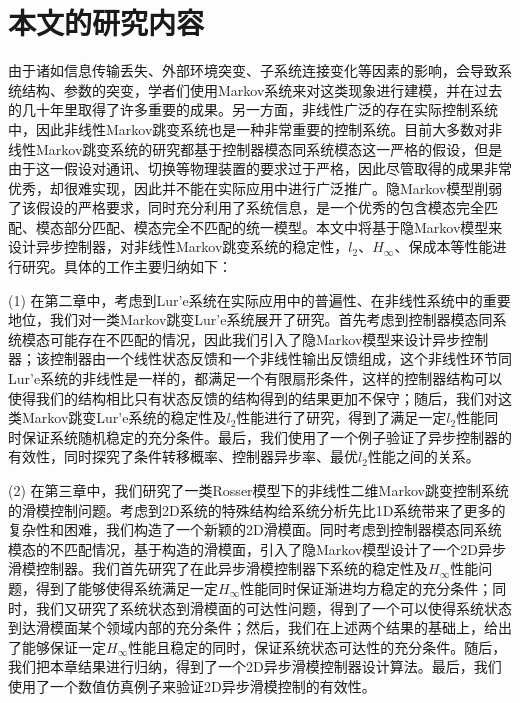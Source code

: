 \section{本文的研究内容}
	由于诸如信息传输丢失、外部环境突变、子系统连接变化等因素的影响，会导致系统结构、参数的突变，学者们使用Markov系统来对这类现象进行建模，并在过去的几十年里取得了许多重要的成果。另一方面，非线性广泛的存在实际控制系统中，因此非线性Markov跳变系统也是一种非常重要的控制系统。目前大多数对非线性Markov跳变系统的研究都基于控制器模态同系统模态这一严格的假设，但是由于这一假设对通讯、切换等物理装置的要求过于严格，因此尽管取得的成果非常优秀，却很难实现，因此并不能在实际应用中进行广泛推广。隐Markov模型削弱了该假设的严格要求，同时充分利用了系统信息，是一个优秀的包含模态完全匹配、模态部分匹配、模态完全不匹配的统一模型。本文中将基于隐Markov模型来设计异步控制器，对非线性Markov跳变系统的稳定性，$l_2$、$H_\infty$、保成本等性能进行研究。具体的工作主要归纳如下：
	
	(1) 在第二章中，考虑到Lur'e系统在实际应用中的普遍性、在非线性系统中的重要地位，我们对一类Markov跳变Lur'e系统展开了研究。首先考虑到控制器模态同系统模态可能存在不匹配的情况，因此我们引入了隐Markov模型来设计异步控制器；该控制器由一个线性状态反馈和一个非线性输出反馈组成，这个非线性环节同Lur'e系统的非线性是一样的，都满足一个有限扇形条件，这样的控制器结构可以使得我们的结构相比只有状态反馈的结构得到的结果更加不保守；随后，我们对这类Markov跳变Lur'e系统的稳定性及$l_2$性能进行了研究，得到了满足一定$l_2$性能同时保证系统随机稳定的充分条件。最后，我们使用了一个例子验证了异步控制器的有效性，同时探究了条件转移概率、控制器异步率、最优$l_2$性能之间的关系。
	
	(2) 在第三章中，我们研究了一类Rosser模型下的非线性二维Markov跳变控制系统的滑模控制问题。考虑到2D系统的特殊结构给系统分析先比1D系统带来了更多的复杂性和困难，我们构造了一个新颖的2D滑模面。同时考虑到控制器模态同系统模态的不匹配情况，基于构造的滑模面，引入了隐Markov模型设计了一个2D异步滑模控制器。我们首先研究了在此异步滑模控制器下系统的稳定性及$H_\infty$性能问题，得到了能够使得系统满足一定$H_\infty$性能同时保证渐进均方稳定的充分条件；同时，我们又研究了系统状态到滑模面的可达性问题，得到了一个可以使得系统状态到达滑模面某个领域内部的充分条件；然后，我们在上述两个结果的基础上，给出了能够保证一定$H_\infty$性能且稳定的同时，保证系统状态可达性的充分条件。随后，我们把本章结果进行归纳，得到了一个2D异步滑模控制器设计算法。最后，我们使用了一个数值仿真例子来验证2D异步滑模控制的有效性。
	
